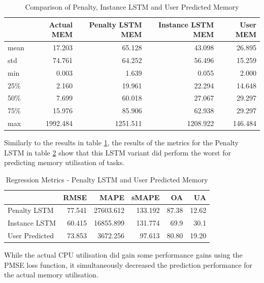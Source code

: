       \begin{table}
        \centering
        \caption{Comparison of Penalty, Instance LSTM and User Predicted Memory}
        \label{tab:comparison-pmse-lstm-user-predicted-memory}

        \begin{tabular}{|l|rrrr|}
          \toprule
          {} &  Actual MEM &  Penalty LSTM MEM &  Instance LSTM MEM &  User MEM \\
          \midrule
          mean &      17.203 &            65.128 &             43.098 &    26.895 \\
          std  &      74.761 &            64.252 &             56.496 &    15.259 \\
          min  &       0.003 &             1.639 &              0.055 &     2.000 \\
          25\%  &       2.160 &            19.961 &             22.294 &    14.648 \\
          50\%  &       7.699 &            60.018 &             27.067 &    29.297 \\
          75\%  &      15.976 &            85.906 &             62.938 &    29.297 \\
          max  &    1992.484 &          1251.511 &           1208.922 &   146.484 \\
          \bottomrule
          \end{tabular}
      \end{table}
      
      Similarly to the results in table \ref{tab:comparison-pmse-lstm-user-predicted-memory}, the results of the metrics for the Penalty LSTM in table \ref{tab:regression-metrics-pmse-lstm-user-predicted-memory} show that this LSTM variant did perform the worst for predicting memory utilisation of tasks.

      \begin{table}
        \centering
        \caption{Regression Metrics - Penalty LSTM and User Predicted Memory}
        \label{tab:regression-metrics-pmse-lstm-user-predicted-memory}

        \begin{tabular}{|l|rrrrr|}
          \toprule
          {} &    RMSE &       MAPE &    sMAPE &     OA &     UA \\
          \midrule
          Penalty LSTM   &  77.541 &  27603.612 &  133.192 &  87.38 &  12.62 \\
          Instance LSTM   &  60.415 &  16855.899 &  131.774 &  69.9 &  30.1 \\
          User Predicted &  73.853 &   3672.256 &   97.613 &  80.80 &  19.20 \\
          \bottomrule
        \end{tabular}
      \end{table}
      While the actual CPU utilisation did gain some performance gains using the PMSE loss function, it simultaneously decreased the prediction performance for the actual memory utilisation. 


